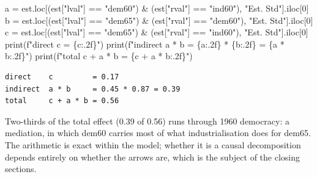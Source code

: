 \documentclass[
  letterpaper,
  10pt,
  twoside,
  openright,
  numbers=noenddot,
  chapterprefix=true]{scrbook}
\newenvironment{Shaded}{}{}
\newcommand{\BuiltInTok}[1]{\textcolor[rgb]{0.84,0.23,0.29}{#1}}
\newcommand{\DecValTok}[1]{\textcolor[rgb]{0.00,0.36,0.77}{#1}}
\newcommand{\NormalTok}[1]{\textcolor[rgb]{0.14,0.16,0.18}{#1}}
\newcommand{\OperatorTok}[1]{\textcolor[rgb]{0.14,0.16,0.18}{#1}}
\newcommand{\SpecialCharTok}[1]{\textcolor[rgb]{0.00,0.36,0.77}{#1}}
\newcommand{\SpecialStringTok}[1]{\textcolor[rgb]{0.01,0.18,0.38}{#1}}
\newcommand{\StringTok}[1]{\textcolor[rgb]{0.01,0.18,0.38}{#1}}
\begin{document}
\label{check-pd-effects}
\begin{Shaded}
\begin{Highlighting}[]
\NormalTok{a }\OperatorTok{=}\NormalTok{ est.loc[(est[}\StringTok{"lval"}\NormalTok{] }\OperatorTok{==} \StringTok{"dem60"}\NormalTok{) }\OperatorTok{\&}\NormalTok{ (est[}\StringTok{"rval"}\NormalTok{] }\OperatorTok{==} \StringTok{"ind60"}\NormalTok{), }\StringTok{"Est. Std"}\NormalTok{].iloc[}\DecValTok{0}\NormalTok{]}
\NormalTok{b }\OperatorTok{=}\NormalTok{ est.loc[(est[}\StringTok{"lval"}\NormalTok{] }\OperatorTok{==} \StringTok{"dem65"}\NormalTok{) }\OperatorTok{\&}\NormalTok{ (est[}\StringTok{"rval"}\NormalTok{] }\OperatorTok{==} \StringTok{"dem60"}\NormalTok{), }\StringTok{"Est. Std"}\NormalTok{].iloc[}\DecValTok{0}\NormalTok{]}
\NormalTok{c }\OperatorTok{=}\NormalTok{ est.loc[(est[}\StringTok{"lval"}\NormalTok{] }\OperatorTok{==} \StringTok{"dem65"}\NormalTok{) }\OperatorTok{\&}\NormalTok{ (est[}\StringTok{"rval"}\NormalTok{] }\OperatorTok{==} \StringTok{"ind60"}\NormalTok{), }\StringTok{"Est. Std"}\NormalTok{].iloc[}\DecValTok{0}\NormalTok{]}
\BuiltInTok{print}\NormalTok{(}\SpecialStringTok{f"direct    c         = }\SpecialCharTok{\{}\NormalTok{c}\SpecialCharTok{:.2f\}}\SpecialStringTok{"}\NormalTok{)}
\BuiltInTok{print}\NormalTok{(}\SpecialStringTok{f"indirect  a * b     = }\SpecialCharTok{\{}\NormalTok{a}\SpecialCharTok{:.2f\}}\SpecialStringTok{ * }\SpecialCharTok{\{}\NormalTok{b}\SpecialCharTok{:.2f\}}\SpecialStringTok{ = }\SpecialCharTok{\{}\NormalTok{a }\OperatorTok{*}\NormalTok{ b}\SpecialCharTok{:.2f\}}\SpecialStringTok{"}\NormalTok{)}
\BuiltInTok{print}\NormalTok{(}\SpecialStringTok{f"total     c + a * b = }\SpecialCharTok{\{}\NormalTok{c }\OperatorTok{+}\NormalTok{ a }\OperatorTok{*}\NormalTok{ b}\SpecialCharTok{:.2f\}}\SpecialStringTok{"}\NormalTok{)}
\end{Highlighting}
\end{Shaded}

\begin{verbatim}
direct    c         = 0.17
indirect  a * b     = 0.45 * 0.87 = 0.39
total     c + a * b = 0.56
\end{verbatim}

Two-thirds of the total effect (0.39 of 0.56) runs through 1960
democracy: a mediation, in which dem60 carries most of what
industrialisation does for dem65. The arithmetic is exact within the
model; whether it is a causal decomposition depends entirely on whether
the arrows are, which is the subject of the closing sections.
\end{document}
